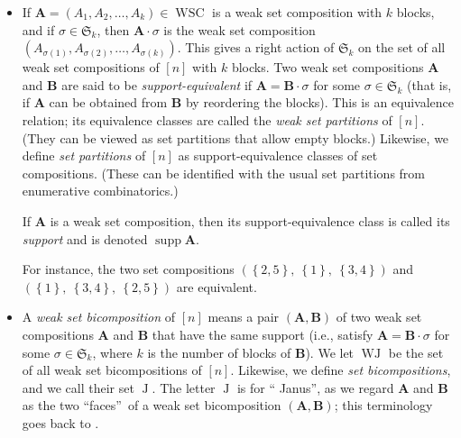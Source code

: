 \documentclass[numbers=enddot,12pt,final,onecolumn,notitlepage]{scrartcl}%
\theoremstyle{definition}
\begin{document}
\begin{itemize}
\item If $\mathbf{A}=\left(  A_{1},A_{2},\ldots,A_{k}\right)  \in
\operatorname*{WSC}$ is a weak set composition with $k$ blocks, and if
$\sigma\in\mathfrak{S}_{k}$, then $\mathbf{A}\cdot\sigma$ is the weak set
composition $\left(  A_{\sigma\left(  1\right)  },A_{\sigma\left(  2\right)
},\ldots,A_{\sigma\left(  k\right)  }\right)  $. This gives a right action of
$\mathfrak{S}_{k}$ on the set of all weak set compositions of $\left[
n\right]  $ with $k$ blocks. Two weak set compositions $\mathbf{A}$ and
$\mathbf{B}$ are said to be \emph{support-equivalent} if $\mathbf{A}%
=\mathbf{B}\cdot\sigma$ for some $\sigma\in\mathfrak{S}_{k}$ (that is, if
$\mathbf{A}$ can be obtained from $\mathbf{B}$ by reordering the blocks). This
is an equivalence relation; its equivalence classes are called the \emph{weak
set partitions} of $\left[  n\right]  $. (They can be viewed as set partitions
that allow empty blocks.) Likewise, we define \emph{set partitions} of
$\left[  n\right]  $ as support-equivalence classes of set compositions.
(These can be identified with the usual set partitions from enumerative combinatorics.)

If $\mathbf{A}$ is a weak set composition, then its support-equivalence class
is called its \emph{support} and is denoted $\operatorname*{supp}\mathbf{A}$.

For instance, the two set compositions $\left(  \left\{  2,5\right\}
,\ \left\{  1\right\}  ,\ \left\{  3,4\right\}  \right)  $ and $\left(
\left\{  1\right\}  ,\ \left\{  3,4\right\}  ,\ \left\{  2,5\right\}  \right)
$ are equivalent.

\item A \emph{weak set bicomposition} of $\left[  n\right]  $ means a pair
$\left(  \mathbf{A},\mathbf{B}\right)  $ of two weak set compositions
$\mathbf{A}$ and $\mathbf{B}$ that have the same support (i.e., satisfy
$\mathbf{A}=\mathbf{B}\cdot\sigma$ for some $\sigma\in\mathfrak{S}_{k}$, where
$k$ is the number of blocks of $\mathbf{B}$). We let $\operatorname*{WJ}$ be
the set of all weak set bicompositions of $\left[  n\right]  $. Likewise, we
define \emph{set bicompositions}, and we call their set $\operatorname*{J}$.
The letter $\operatorname*{J}$ is for \textquotedblleft
Janus\textquotedblright, as we regard $\mathbf{A}$ and $\mathbf{B}$ as the two
\textquotedblleft faces\textquotedblright\ of a weak set bicomposition
$\left(  \mathbf{A},\mathbf{B}\right)  $; this terminology goes back to
\cite[\S 1.9.3]{AguMah20}.
\end{itemize}
\end{document}
